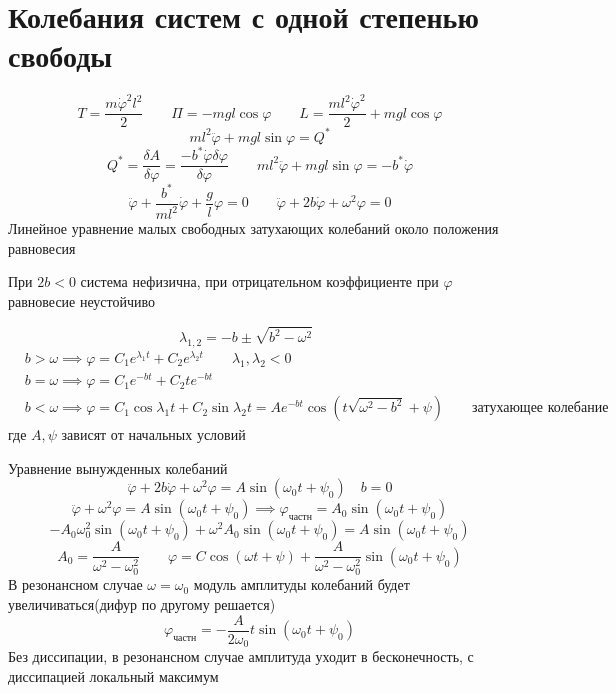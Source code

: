 \documentclass[crop=false]{standalone}
\begin{document}
\section{Колебания систем с одной степенью свободы}
\[T = \frac{m \dot \varphi^2 l^2}{2} \qquad \Pi = - m g l \cos \varphi \qquad L = \frac{m l^2 \dot \varphi^2}{2} + m g l \cos \varphi\]
\[m l^2 \ddot \varphi + m g l \sin \varphi = Q^*\]
\[Q^* = \frac{\delta A}{\delta \varphi} = \frac{- b^* \dot \varphi \delta \varphi}{\delta \varphi} \qquad m l^2 \ddot \varphi + m g l \sin \varphi = - b^* \dot \varphi\]
\[\ddot \varphi + \frac{b^*}{m l^2} \dot \varphi + \frac{g}{l} \varphi = 0 \qquad \ddot \varphi + 2 b \dot \varphi + \omega^2 \varphi = 0\]
Линейное уравнение малых свободных затухающих колебаний около положения равновесия

\noindent \keypoint При $2 b < 0$ система нефизична, при отрицательном коэффициенте при $\varphi$ равновесие неустойчиво

\noindent \keypoint 
\[\lambda_{1, 2} = - b \pm \sqrt{b^2 - \omega^2} \qquad \]
\[\begin{aligned}
&b > \omega \implies \varphi = C_1 e^{\lambda_1 t} + C_2 e^{\lambda_2 t} \qquad \lambda_1 , \lambda_2 < 0 \\
&b = \omega \implies \varphi = C_1 e^{-b t } + C_2 t e^{- b t} \\
& b < \omega \implies \varphi = C_1 \cos \lambda_1 t + C_2 \sin \lambda_2 t  = A e^{- b t} \cos\left( t \sqrt{\omega^2 - b^2} + \psi \right) \qquad \text{затухающее колебание} 
\end{aligned}
\]
где $A, \psi$ зависят от начальных условий

\noindent \keypoint Уравнение вынужденных колебаний
\[\ddot \varphi + 2 b \dot \varphi+ \omega^2 \varphi = A \sin(\omega_0 t + \psi_0) \quad b = 0\]
\[\ddot \varphi + \omega^2 \varphi = A \sin(\omega_0 t + \psi_0) \implies \varphi_{\text{частн}} = A_0 \sin (\omega_0 t + \psi_0)\]
\[- A_0 \omega_0^2 \sin(\omega_0 t + \psi_0) + \omega^2 A_0 \sin(\omega_0 t + \psi_0) = A \sin (\omega_0 t + \psi_0)\]
\[A_0 = \frac{A}{\omega^2 - \omega_0^2} \qquad \varphi = C \cos(\omega t + \psi) + \frac{A}{\omega^2 - \omega_0^2} \sin(\omega_0 t + \psi_0)\]
В резонансном случае $\omega = \omega_0$ модуль амплитуды колебаний будет увеличиваться(дифур по другому решается)
\[\varphi_{\text{частн}} = - \frac{A}{2 \omega_0} t \sin ( \omega_0 t + \psi_0)\]
Без диссипации, в резонансном случае амплитуда уходит в бесконечность, с диссипацией локальный максимум
\end{document}
